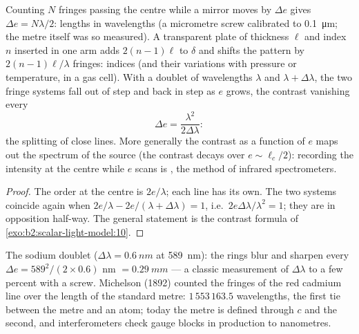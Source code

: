 \begin{proposition}\label{prop:b2:michelson:measure}
Counting $N$ fringes passing the centre while a mirror moves by $\Delta e$
gives $\Delta e = N\lambda/2$: lengths in wavelengths (a micrometre screw
calibrated to \qty{0.1}{\micro m}; the metre itself was so measured). A
transparent plate of thickness $\ell$ and index $n$ inserted in one arm
adds $2(n - 1)\ell$ to $\delta$ and shifts the pattern by $2(n - 1)\ell/\lambda$
fringes: indices (and their variations with pressure or temperature,
in a gas cell). With a doublet of wavelengths $\lambda$ and $\lambda + \Delta\lambda$, the
two fringe systems fall out of step and back in step as $e$ grows, the
contrast vanishing every
\[
\Delta e = \frac{\lambda^2}{2\Delta\lambda} :
\]
the splitting of close lines. More generally the contrast as a
function of $e$ maps out the spectrum of the source (the contrast
decays over $e \sim \ell_c/2$): recording the intensity at the centre while
$e$ scans is \emph{}, the method of
infrared spectrometers.
\end{proposition}

\begin{proof}
The order at the centre is $2e/\lambda$; each line has its own. The two
systems coincide again when $2e/\lambda - 2e/(\lambda + \Delta\lambda) = 1$, i.e.\ $2e\Delta\lambda
/\lambda^2 = 1$; they are in opposition half-way. The general statement is
the contrast formula of \cref{exo:b2:scalar-light-model:10}.
\end{proof}

\begin{example}\label{ex:b2:michelson:sodium}
The sodium doublet ($\Delta\lambda = \qty{0.6}{nm}$ at \qty{589}{nm}): the rings blur and
sharpen every $\Delta e = 589^2/(2 \times 0.6)$ nm $= \qty{0.29}{mm}$ --- a classic
measurement of $\Delta\lambda$ to a few percent with a screw. Michelson (1892)
counted the fringes of the red cadmium line over the length of the
standard metre: $1\,553\,163.5$ wavelengths, the first tie between the
metre and an atom; today the metre is defined through $c$ and the
second, and interferometers check gauge blocks in production to
nanometres.
\end{example}

